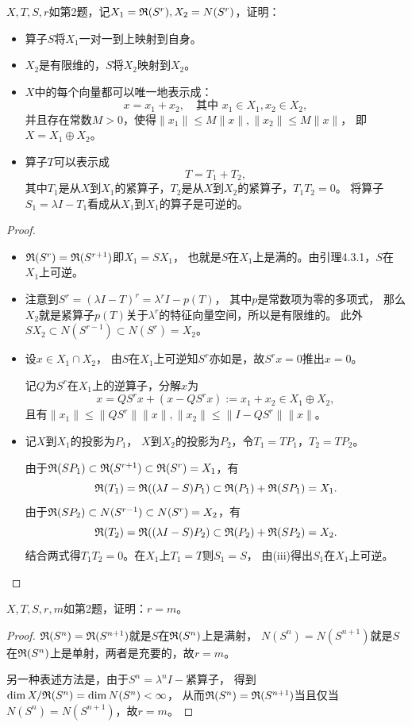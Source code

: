 \begin{3}
    $X,T,S,r$如第2题，记$X_1=\mathfrak{R}(S^r),X_2=N(S^r)$，证明：
    \begin{itemize}
    \item[(iii)] 算子$S$将$X_1$一对一到上映射到自身。
    \item[(iv)] $X_2$是有限维的，$S$将$X_2$映射到$X_2$。
    \item[(v)] $X$中的每个向量都可以唯一地表示成：
    \[x=x_1+x_2,\quad\text{其中 }x_1\in X_1,x_2\in X_2,\]
    并且存在常数$M>0$，使得$\|x_1\|\leqslant M\|x\|,\|x_2\|\leqslant M\|x\|$，
    即$X=X_1\oplus X_2$。
    \item[(vi)] 算子$T$可以表示成
    \[T=T_1+T_2,\]
    其中$T_1$是从$X$到$X_1$的紧算子，$T_2$是从$X$到$X_2$的紧算子，$T_1T_2=0$。
    将算子$S_1=\lambda I-T_1$看成从$X_1$到$X_1$的算子是可逆的。
    \end{itemize}
\end{3}
\begin{proof}
\begin{itemize}
    \item[(iii)] $\mathfrak{R}(S^r)=\mathfrak{R}(S^{r+1})$即$X_1=SX_1$，
    也就是$S$在$X_1$上是满的。由引理4.3.1，$S$在$X_1$上可逆。
    \item[(iv)] 注意到$S^r=(\lambda I-T)^r=\lambda^rI-p(T)$，
    其中$p$是常数项为零的多项式，
    那么$X_2$就是紧算子$p(T)$关于$\lambda^r$的特征向量空间，所以是有限维的。
    此外$SX_2\subset N(S^{r-1})\subset N(S^r)=X_2$。
    \item[(v)] 设$x\in X_1\cap X_2$，
    由$S$在$X_1$上可逆知$S^r$亦如是，故$S^rx=0$推出$x=0$。

    记$Q$为$S^r$在$X_1$上的逆算子，分解$x$为
    \[x=QS^rx+(x-QS^rx):=x_1+x_2\in X_1\oplus X_2,\]
    且有$\|x_1\|\leqslant\|QS^r\|\|x\|,\|x_2\|\leqslant\|I-QS^r\|\|x\|$。
    \item[(vi)] 记$X$到$X_1$的投影为$P_1$，
    $X$到$X_2$的投影为$P_2$，令$T_1=TP_1$，$T_2=TP_2$。
    
    由于$\mathfrak{R}(SP_1)\subset\mathfrak{R}(S^{r+1})\subset\mathfrak{R}(S^r)=X_1$，有
    \[\mathfrak{R}(T_1)=\mathfrak{R}((\lambda I-S)P_1)\subset\mathfrak{R}(P_1)+\mathfrak{R}(SP_1)=X_1.\]
    由于$\mathfrak{R}(SP_2)\subset N(S^{r-1})\subset N(S^r)=X_2$，有
    \[\mathfrak{R}(T_2)=\mathfrak{R}((\lambda I-S)P_2)\subset\mathfrak{R}(P_2)+\mathfrak{R}(SP_2)=X_2.\]
    结合两式得$T_1T_2=0$。在$X_1$上$T_1=T$则$S_1=S$，
    由(iii)得出$S_1$在$X_1$上可逆。\qedhere
\end{itemize}
\end{proof}

\begin{4}
    $X,T,S,r,m$如第2题，证明：$r=m$。
\end{4}
\begin{proof}
    $\mathfrak{R}(S^n)=\mathfrak{R}(S^{n+1})$就是$S$在$\mathfrak{R}(S^n)$上是满射，
    $N(S^n)=N(S^{n+1})$就是$S$在$\mathfrak{R}(S^n)$上是单射，两者是充要的，故$r=m$。
    
    另一种表述方法是，由于$S^n=\lambda^nI-$紧算子，
    得到$\dim X/\mathfrak{R}(S^n)=\dim N(S^n)<\infty$，
    从而$\mathfrak{R}(S^n)=\mathfrak{R}(S^{n+1})$当且仅当$N(S^n)=N(S^{n+1})$，故$r=m$。
\end{proof}

